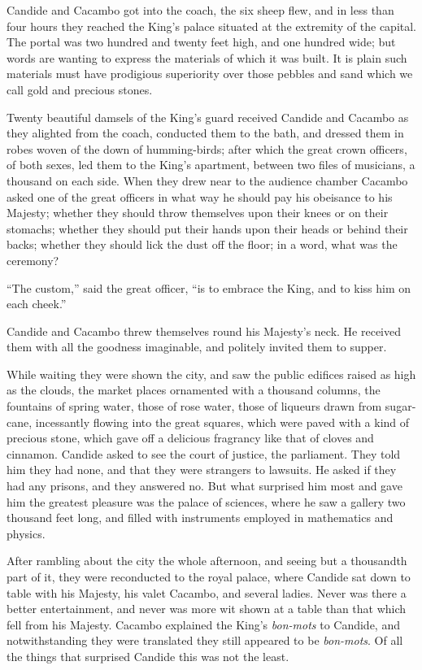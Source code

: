 Candide and Cacambo got into the coach, the six sheep flew, and in less than four hours they reached the King's palace situated at the extremity of the capital. The portal was two hundred and twenty feet high, and one hundred wide; but words are wanting to express the materials of which it was built. It is plain such materials must have prodigious superiority over those pebbles and sand which we call gold and precious stones.

Twenty beautiful damsels of the King's guard received Candide and Cacambo as they alighted from the coach, conducted them to the bath, and dressed them in robes woven of the down of humming-birds; after which the great crown officers, of both sexes, led them to the King's apartment, between two files of musicians, a thousand on each side. When they drew near to the audience chamber Cacambo asked one of the great officers in what way he should pay his obeisance to his Majesty; whether they should throw themselves upon their knees or on their stomachs; whether they should put their hands upon their heads or behind their backs; whether they should lick the dust off the floor; in a word, what was the ceremony?

``The custom,'' said the great officer, ``is to embrace the King, and to kiss him on each cheek.''

Candide and Cacambo threw themselves round his Majesty's neck. He received them with all the goodness imaginable, and politely invited them to supper.

While waiting they were shown the city, and saw the public edifices raised as high as the clouds, the market places ornamented with a thousand columns, the fountains of spring water, those of rose water, those of liqueurs drawn from sugar-cane, incessantly flowing into the great squares, which were paved with a kind of precious stone, which gave off a delicious fragrancy like that of cloves and cinnamon. Candide asked to see the court of justice, the parliament. They told him they had none, and that they were strangers to lawsuits. He asked if they had any prisons, and they answered no. But what surprised him most and gave him the greatest pleasure was the palace of sciences, where he saw a gallery two thousand feet long, and filled with instruments employed in mathematics and physics.

After rambling about the city the whole afternoon, and seeing but a thousandth part of it, they were reconducted to the royal palace, where Candide sat down to table with his Majesty, his valet Cacambo, and several ladies. Never was there a better entertainment, and never was more wit shown at a table than that which fell from his Majesty. Cacambo explained the King's \textit{bon-mots} to Candide, and notwithstanding they were translated they still appeared to be \textit{bon-mots}. Of all the things that surprised Candide this was not the least.

